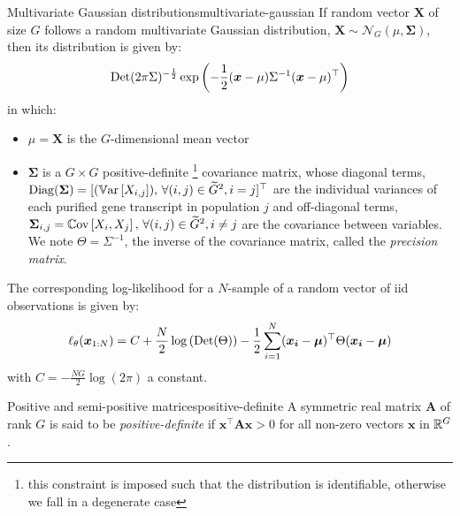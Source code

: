 \begin{Definition}{Multivariate Gaussian distributions}{multivariate-gaussian}
If random vector $\boldsymbol{X}$ of size $G$ follows a random multivariate Gaussian distribution, $\boldsymbol{X} \sim \mathcal{N}_G(\mu, \boldsymbol{\Sigma})$, then its distribution is given by:
\begin{equation*}
    \operatorname*{Det}(2\pi\Sigma)^{-\frac{1}{2}} \exp\left( -\frac{1}{2} (\boldsymbol{x} - \mu) \Sigma^{-1} (\boldsymbol{x} - \mu)^\top\right)
\end{equation*}
in which:
\begin{itemize}
    \item $\mu=\boldsymbol{X}$ is the $G$-dimensional mean vector
    \item $\boldsymbol{\Sigma}$ is a $G\times G$ positive-definite  \footnote{this constraint is imposed such that the distribution is identifiable, otherwise we fall in a degenerate case} covariance matrix, whose diagonal terms, $\operatorname*{Diag}(\boldsymbol{\Sigma})=[(\operatorname*{\mathbb{V}\text{ar}}\left[{X_{i,j}}\right]), \, \forall (i, j) \in \widetilde{G}^2, i= j]^\top$ are the individual variances of each purified gene transcript in population $j$ and off-diagonal terms, $\boldsymbol{\Sigma}_{i,j}=\operatorname*{\mathbb{C}\text{ov}}\left[{X_{i}, X_{j}}\right], \, \forall (i, j) \in \widetilde{G}^2, i \neq j$ are the covariance between variables. We note $\Theta=\Sigma^{-1}$, the inverse of the covariance matrix, called the \textit{precision matrix}.
\end{itemize}

The corresponding log-likelihood for a $N$-sample of a random vector of iid observations is given by:
\begin{equation}
    \label{eq:loglikelihood-multivariate-gaussian}
    \ell_{\theta}(\boldsymbol{x}_{1:N})=C + \frac{N}{2} \log\left(\operatorname*{Det}(\Theta)\right) - \frac{1}{2} \sum_{i=1}^N (\boldsymbol{x_i} - \boldsymbol{\mu})^\top \Theta (\boldsymbol{x_i} - \boldsymbol{\mu})
\end{equation}
with $C=-\frac{NG}{2}\log(2\pi)$ a constant.

\end{Definition}

\begin{Definition}{Positive and semi-positive matrices}{positive-definite}
A symmetric real matrix $\boldsymbol{A}$ of rank $G$ is said to be \textit{positive-definite} if $\boldsymbol{x}^\top \boldsymbol{A} \boldsymbol{x} > 0$ for all non-zero vectors $\boldsymbol{x}$ in $\mathbb{R}^G$.
\end{Definition}

